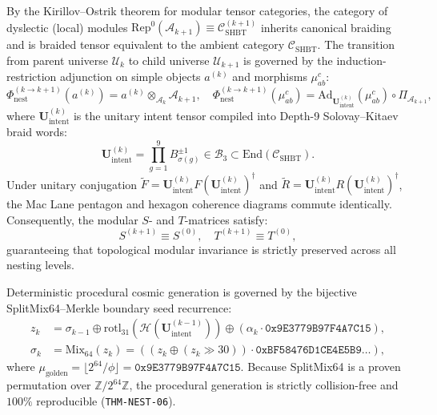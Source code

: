 \documentclass[11pt,onecolumn]{article}
\begin{document}
By the Kirillov--Ostrik theorem for modular tensor categories, the category of dyslectic (local) modules $\mathrm{Rep}^0(\mathcal{A}_{k+1}) \equiv \mathcal{C}_{\text{SHBT}}^{(k+1)}$ inherits canonical braiding and is braided tensor equivalent to the ambient category $\mathcal{C}_{\text{SHBT}}$. The transition from parent universe $\mathcal{U}_k$ to child universe $\mathcal{U}_{k+1}$ is governed by the induction-restriction adjunction on simple objects $a^{(k)}$ and morphisms $\mu_{ab}^c$:
\begin{equation}
\Phi_{\text{nest}}^{(k \to k+1)}(a^{(k)}) = a^{(k)} \otimes_{\mathcal{A}_k} \mathcal{A}_{k+1}, \quad \Phi_{\text{nest}}^{(k \to k+1)}(\mu_{ab}^c) = \mathrm{Ad}_{\mathbf{U}_{\text{intent}}^{(k)}}(\mu_{ab}^c) \circ \Pi_{\mathcal{A}_{k+1}},
\end{equation}
where $\mathbf{U}_{\text{intent}}^{(k)}$ is the unitary intent tensor compiled into Depth-9 Solovay--Kitaev braid words:
\begin{equation}
\mathbf{U}_{\text{intent}}^{(k)} = \prod_{g=1}^9 B_{\sigma(g)}^{\pm 1} \in \mathcal{B}_3 \subset \mathrm{End}(\mathcal{C}_{\text{SHBT}}).
\end{equation}
Under unitary conjugation $\widetilde{F} = \mathbf{U}_{\text{intent}}^{(k)} F (\mathbf{U}_{\text{intent}}^{(k)})^\dagger$ and $\widetilde{R} = \mathbf{U}_{\text{intent}}^{(k)} R (\mathbf{U}_{\text{intent}}^{(k)})^\dagger$, the Mac Lane pentagon and hexagon coherence diagrams commute identically. Consequently, the modular $S$- and $T$-matrices satisfy:
\begin{equation}
S^{(k+1)} \equiv S^{(0)}, \quad T^{(k+1)} \equiv T^{(0)},
\end{equation}
guaranteeing that topological modular invariance is strictly preserved across all nesting levels.

Deterministic procedural cosmic generation is governed by the bijective SplitMix64--Merkle boundary seed recurrence:
\begin{align}
z_k &= \sigma_{k-1} \oplus \mathrm{rotl}_{31}(\mathcal{H}(\mathbf{U}_{\text{intent}}^{(k-1)})) \oplus (\alpha_k \cdot \mathtt{0x9E3779B97F4A7C15}), \\
\sigma_k &= \mathrm{Mix}_{64}(z_k) = \left( \left( z_k \oplus (z_k \gg 30) \right) \cdot \mathtt{0xBF58476D1CE4E5B9} \dots \right),
\end{align}
where $\mu_{\text{golden}} = \lfloor 2^{64}/\phi \rfloor = \mathtt{0x9E3779B97F4A7C15}$. Because SplitMix64 is a proven permutation over $\mathbb{Z}/2^{64}\mathbb{Z}$, the procedural generation is strictly collision-free and $100\%$ reproducible (\texttt{THM-NEST-06}).
\end{document}
